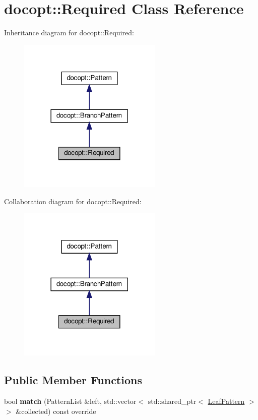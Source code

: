 \hypertarget{classdocopt_1_1Required}{}\section{docopt\+:\+:Required Class Reference}
\label{classdocopt_1_1Required}


Inheritance diagram for docopt\+:\+:Required\+:
\nopagebreak
\begin{figure}[H]
\begin{center}
\leavevmode
\includegraphics[width=194pt]{classdocopt_1_1Required__inherit__graph}
\end{center}
\end{figure}


Collaboration diagram for docopt\+:\+:Required\+:
\nopagebreak
\begin{figure}[H]
\begin{center}
\leavevmode
\includegraphics[width=194pt]{classdocopt_1_1Required__coll__graph}
\end{center}
\end{figure}
\subsection*{Public Member Functions}
\begin{DoxyCompactItemize}
\item 
\mbox{\label{classdocopt_1_1Required_a83b4fcb821eebe551d5fdf3ff9703c97}} 
bool {\bfseries match} (Pattern\+List \&left, std\+::vector$<$ std\+::shared\+\_\+ptr$<$ \hyperlink{classdocopt_1_1LeafPattern}{Leaf\+Pattern} $>$$>$ \&collected) const override
\end{DoxyCompactItemize}
